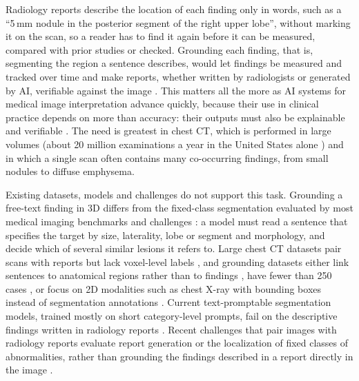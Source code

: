 \documentclass[final,5p,times,twocolumn,authoryear,numafflabel]{elsarticle}
\begin{document}
Radiology reports describe the location of each finding only in words, such
as a ``5\,mm nodule in the posterior segment of the right upper lobe'', without
marking it on the scan, so a reader has to find it again before it can be
measured, compared with prior studies or checked. Grounding each finding, that
is, segmenting the region a sentence describes, would let findings be measured
and tracked over time and make reports, whether written by radiologists or
generated by AI, verifiable against the image
\citep{bannur2024maira,baharoon2026rexgroundingct}. This matters all the more
as AI systems for medical image interpretation advance quickly, because their
use in clinical practice depends on more than accuracy: their outputs must
also be explainable and verifiable
\citep{rajpurkar2023current,silcox2024potential,abgrall2024should}. The need is greatest in
chest CT, which is performed in large volumes (about 20 million
examinations a year in the United States alone \citep{smith2025projected})
and in which a single scan often contains many co-occurring findings, from
small nodules to diffuse emphysema.

Existing datasets, models and challenges do not support this task. Grounding
a free-text finding in 3D differs from the fixed-class segmentation
evaluated by most medical imaging benchmarks and challenges
\citep{antonelli2022medical,bilic2023liver,heller2021state,ma2024unleashing,heller2023kits21,kavur2021chaos,dorent2024lnq,luo2025segrap2023,ma2024automatic}:
a model must read a sentence that specifies the target by size, laterality, lobe
or segment and morphology, and decide which of several similar lesions it refers
to. Large chest CT datasets pair scans
with reports but lack voxel-level labels \citep{hamamci2026generalist}, and grounding datasets either link
sentences to anatomical regions rather than to findings
\citep{zhang2025development}, have fewer than 250 cases \citep{bai2024m3d}, or focus on 2D
modalities such as chest X-ray with bounding boxes instead of segmentation annotations
\citep{boecking2022making,de2025padchest}. Current text-promptable
segmentation models, trained mostly on short category-level prompts, fail on the descriptive findings
written in radiology reports
\citep{zhao2025large,zhao2025foundation,zhao2025biomedparse,du2024segvol,subramanian2026open,baharoon2025state}.
Recent challenges that pair images with radiology
reports evaluate report generation
or the localization of fixed classes of abnormalities, rather than grounding
the findings described in a report directly in the image
\citep{xu2024overview,hamamci_2025_15052708,hamamci_2026_19847782}.
\end{document}
